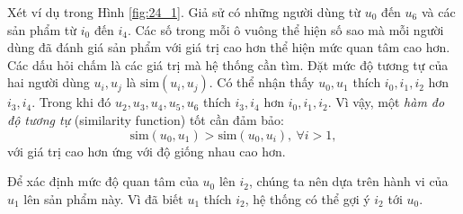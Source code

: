 Xét ví dụ trong Hình \ref{fig:24_1}. Giả sử có những người dùng từ $u_0$ đến
$u_6$ và các sản phẩm từ $i_0$ đến $i_4$.  Các số trong mỗi ô vuông thể hiện {số
sao} mà mỗi người dùng đã đánh giá sản phẩm với giá trị cao hơn thể hiện {mức
quan tâm} cao hơn. Các dấu hỏi chấm là các giá trị mà hệ thống cần tìm. Đặt {mức
độ tương tự} của hai người dùng $u_i, u_j$ là $\text{sim}(u_i, u_j)$. Có thể
nhận thấy $u_0, u_1$ {thích} $i_0, i_1, i_2$ hơn $i_3, i_4$. Trong khi đó $u_2,
u_3, u_4, u_5, u_6$ thích $i_3, i_4$ hơn $i_0, i_1, i_2$. Vì vậy, một
\textit{hàm đo độ tương tự} ({similarity function}) tốt cần đảm bảo:
\begin{equation}
\text{sim}(u_0, u_1) > \text{sim}(u_0, u_i), ~\forall i > 1,
\end{equation}
với giá trị cao hơn ứng với độ giống nhau cao hơn.

Để xác định {mức độ quan tâm} của $u_0$ lên $i_2$, chúng
ta nên dựa trên {hành vi} của $u_1$ lên sản phẩm này. Vì đã biết $u_1$ {thích} $i_2$, hệ thống có thể gợi ý $i_2$ tới $u_0$.

